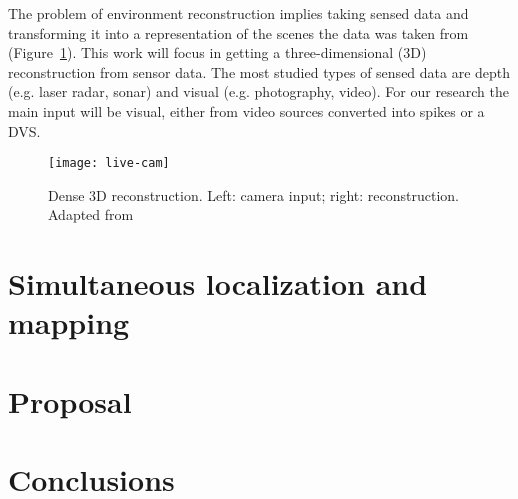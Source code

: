 The problem of environment reconstruction implies taking sensed data and transforming it into a representation of the scenes the data was taken from (Figure~\ref{fig:slam:example}). This work will focus in getting a three-dimensional (3D) reconstruction from sensor data. The most studied types of sensed data are depth (e.g. laser radar, sonar) and visual (e.g. photography, video). For our research the main input will be visual, either from video sources converted into spikes or a DVS. 

\begin{figure}[h]
  \begin{center}
    \texttt{[image: live-cam]}
    \caption{Dense 3D reconstruction. Left: camera input; right: reconstruction. Adapted from~\cite{livecam}}
    \label{fig:slam:example}
  \end{center}
\end{figure}

\section{Simultaneous localization and mapping}



\section{Proposal}



\section{Conclusions}
